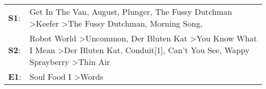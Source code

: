 \begin{supertabular}{p{0.03\textwidth}p{0.92\textwidth}}
 \textbf{S1}:  &                                                                                    Get In The Van\textsuperscript{}, \enspace August\textsuperscript{}, \enspace Plunger\textsuperscript{}, \enspace The Fussy Dutchman\textsuperscript{} \textgreater \enspace Keefer\textsuperscript{} \textgreater \enspace The Fussy Dutchman\textsuperscript{}, \enspace Morning Song\textsuperscript{}, \textsuperscript{}  \enspace  \\
 \textbf{S2}:  &  Robot World\textsuperscript{} \textgreater \enspace Uncommon\textsuperscript{}, \enspace Der Bluten Kat\textsuperscript{} \textgreater \enspace You Know What I Mean\textsuperscript{} \textgreater \enspace Der Bluten Kat\textsuperscript{}, \enspace Conduit[1]\textsuperscript{}, \enspace Can't You See\textsuperscript{}, \enspace Wappy Sprayberry\textsuperscript{} \textgreater \enspace Thin Air\textsuperscript{}  \enspace  \\
 \textbf{E1}:  &                                                                                                                                                                                                                                                                                                                                                   Soul Food I\textsuperscript{} \textgreater \enspace Words\textsuperscript{}  \enspace  \\
\end{supertabular}

